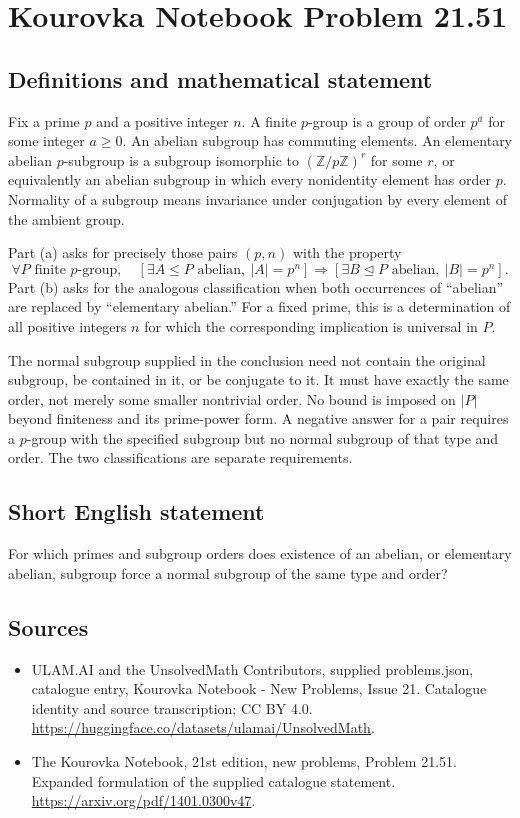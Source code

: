 \documentclass[11pt,a4paper]{article}
\begin{document}
\section*{Kourovka Notebook Problem 21.51}\label{statement}

\subsection{Definitions and mathematical statement}
Fix a prime $p$ and a positive integer $n$. A finite $p$-group is a
group of order $p^a$ for some integer $a\ge0$. An abelian subgroup
has commuting elements. An elementary abelian $p$-subgroup is a subgroup
isomorphic to $(\mathbb Z/p\mathbb Z)^r$ for some $r$, or equivalently
an abelian subgroup in which every nonidentity element has order $p$.
Normality of a subgroup means invariance under conjugation by every
element of the ambient group.

Part (a) asks for precisely those pairs $(p,n)$ with the property
\[
 \forall P\text{ finite }p\text{-group},\quad
 [\exists A\le P\text{ abelian},\ |A|=p^n]
 \Longrightarrow
 [\exists B\trianglelefteq P\text{ abelian},\ |B|=p^n].
\]
Part (b) asks for the analogous classification when both occurrences
of ``abelian'' are replaced by ``elementary abelian.''
For a fixed prime, this is a determination of all positive integers
$n$ for which the corresponding implication is universal in $P$.

The normal subgroup supplied in the conclusion need not contain the
original subgroup, be contained in it, or be conjugate to it. It must
have exactly the same order, not merely some smaller nontrivial order.
No bound is imposed on $|P|$ beyond finiteness and its prime-power
form. A negative answer for a pair requires a $p$-group with the
specified subgroup but no normal subgroup of that type and order.
The two classifications are separate requirements.
\subsection{Short English statement}
For which primes and subgroup orders does existence of an abelian, or elementary abelian, subgroup force a normal subgroup of the same type and order?
\subsection{Sources}
\begin{itemize}
\item[S1] ULAM.AI and the UnsolvedMath Contributors, supplied problems.json, catalogue entry, Kourovka Notebook - New Problems, Issue 21. Catalogue identity and source transcription; CC BY 4.0.
\url{https://huggingface.co/datasets/ulamai/UnsolvedMath}.
\item[S2] The Kourovka Notebook, 21st edition, new problems, Problem 21.51. Expanded formulation of the supplied catalogue statement.
\url{https://arxiv.org/pdf/1401.0300v47}.
\end{itemize}
\end{document}
